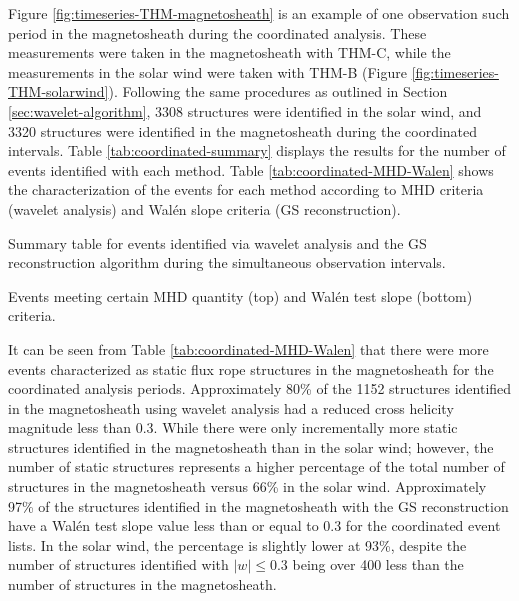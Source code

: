 Figure \ref{fig:timeseries-THM-magnetosheath} is an example of one observation such period in the magnetosheath during the coordinated analysis. These measurements were taken in the magnetosheath with THM-C, while the measurements in the solar wind were taken with THM-B (Figure \ref{fig:timeseries-THM-solarwind}). Following the same procedures as outlined in Section \ref{sec:wavelet-algorithm}, 3308 structures were identified in the solar wind, and 3320 structures were identified in the magnetosheath during the coordinated intervals. Table \ref{tab:coordinated-summary} displays the results for the number of events identified with each method. Table \ref{tab:coordinated-MHD-Walen} shows the characterization of the events for each method according to MHD criteria (wavelet analysis) and Wal\'en slope criteria (GS reconstruction).

\begin{table}
    \centering
    \caption{Summary table for events identified via wavelet analysis and the GS reconstruction algorithm during the simultaneous observation intervals.}
    
    \label{tab:coordinated-summary}
\end{table}

\begin{table}
    \centering
    \caption{Events meeting certain MHD quantity (top) and Wal\'en test slope (bottom) criteria.}
    
    \label{tab:coordinated-MHD-Walen}
\end{table}

It can be seen from Table \ref{tab:coordinated-MHD-Walen} that there were more events characterized as static flux rope structures in the magnetosheath for the coordinated analysis periods. Approximately 80\% of the 1152 structures identified in the magnetosheath using wavelet analysis had a reduced cross helicity magnitude less than 0.3. While there were only incrementally more static structures identified in the magnetosheath than in the solar wind; however, the number of static structures represents a higher percentage of the total number of structures in the magnetosheath versus 66\% in the solar wind. Approximately 97\% of the structures identified in the magnetosheath with the GS reconstruction have a Wal\'en test slope value less than or equal to 0.3 for the coordinated event lists. In the solar wind, the percentage is slightly lower at 93\%, despite the number of structures identified with $|w|\leq 0.3$ being over 400 less than the number of structures in the magnetosheath.

